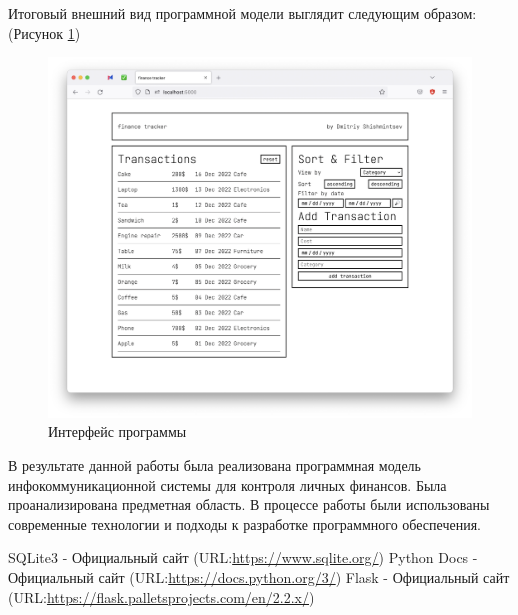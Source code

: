 \documentclass[14pt]{extreport}
\begin{document}
Итоговый внешний вид программной модели выглядит следующим образом: (Рисунок \ref{fig:d7})
\begin{figure}[h]   
    \centering
    \includegraphics[width=1\linewidth]{int.png}
    \caption{ Интерфейс программы }
    \label{fig:d7}
\end{figure}

\conclusions

В результате данной работы была реализована программная модель инфокоммуникационной системы для контроля личных финансов. Была проанализирована предметная область. В процессе работы были использованы современные технологии и подходы к разработке программного обеспечения. 


\newpage
\begin{thebibliography}{99}
	 	\label{bib:bib1} SQLite3 - Официальный сайт (URL:\url{https://www.sqlite.org/})
     	\label{bib:bib2} Python Docs - Официальный сайт (URL:\url{https://docs.python.org/3/})
     	\label{bib:bib2} Flask  - Официальный сайт (URL:\url{https://flask.palletsprojects.com/en/2.2.x/})
\end{thebibliography}
\end{document}

